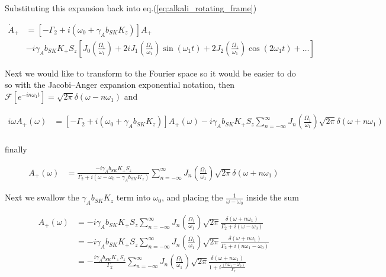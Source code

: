 \documentclass{article}
\begin{document}
Substituting this expansion back into eq.(\ref{eq:alkali_rotating_frame})

\begin{align}
    \dot{A}_+  &= \left[-\Gamma_2 + i\left(\omega_0 + \gamma_{A}b_{SK}K_z\right) \right]A_+ \\ &- i \gamma_{A}b_{SK}K_+ S_z \left[J_0\left(\frac{\Omega_1}{\omega_1}\right)+ 2i J_{1}\left(\frac{\Omega_1}{\omega_1}\right)\sin{\left(\omega_1 t\right)}+2 J_{2}\left(\frac{\Omega_1}{\omega_1}\right)\cos{\left(2\omega_1 t\right)}+\dots\right]
\end{align}
 
Next we would like to transform to the Fourier space so it would be easier to do so with the Jacobi–Anger expansion exponential notation, then $\mathcal{F}\left[e^{-in\omega_1 t}\right] = \sqrt{2\pi}\delta \left(\omega - n\omega_1\right)$ and

\begin{align}
    i\omega A_+\left(\omega\right)  &= \left[-\Gamma_2 + i\left(\omega_0 + \gamma_{A}b_{SK}K_z\right) \right]A_+\left(\omega\right)  - i \gamma_{A}b_{SK}K_+ S_z \sum_{n=-\infty}^{\infty}J_n\left(\frac{\Omega_1}{\omega_1}\right)\sqrt{2\pi}\delta \left(\omega + n\omega_1\right)\\
\end{align}

finally

\begin{align}
     A_+\left(\omega\right)  &= \frac{-i \gamma_{A}b_{SK}K_+ S_z}{\Gamma_2 + i\left(\omega - \omega_0 - \gamma_{A}b_{SK}K_z\right) } \sum_{n=-\infty}^{\infty}J_n\left(\frac{\Omega_1}{\omega_1}\right)\sqrt{2\pi}\delta \left(\omega + n\omega_1\right)
\end{align}

Next we swallow the $\gamma_{A}b_{SK}K_z$ term into $\omega_0$, and placing the $\frac{1}{\omega-\omega_0}$ inside the sum

\begin{align}
     A_+\left(\omega\right)  &= -i \gamma_{A}b_{SK}K_+ S_z \sum_{n=-\infty}^{\infty}J_n\left(\frac{\Omega_1}{\omega_1}\right)\sqrt{2\pi} \frac{\delta\left(\omega + n\omega_1\right)}{\Gamma_2 + i\left(\omega - \omega_0\right)}\\
      &= -i \gamma_{A}b_{SK}K_+ S_z \sum_{n=-\infty}^{\infty}J_n\left(\frac{\Omega_1}{\omega_1}\right)\sqrt{2\pi} \frac{\delta\left(\omega + n\omega_1\right)}{\Gamma_2 + i\left(n\omega_1 - \omega_0\right)}\\
      &= -\frac{i \gamma_{A}b_{SK}K_+ S_z}{\Gamma_2} \sum_{n=-\infty}^{\infty}J_n\left(\frac{\Omega_1}{\omega_1}\right)\sqrt{2\pi} \frac{\delta\left(\omega + n\omega_1\right)}{1 + i\frac{\left(n\omega_1 - \omega_0\right)}{\Gamma_2}}\label{eq:alkali_esr_frame}
\end{align}
\end{document}
